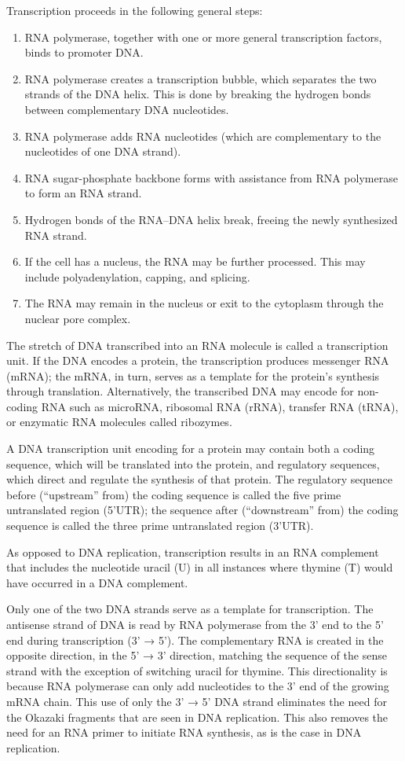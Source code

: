 Transcription proceeds in the following general steps:

\begin{enumerate}
\def\labelenumi{\arabic{enumi}.}
\tightlist
\item
  RNA polymerase, together with one or more general transcription factors, binds to promoter DNA.
\item
  RNA polymerase creates a transcription bubble, which separates the two strands of the DNA helix. This is done by breaking the hydrogen bonds between complementary DNA nucleotides.
\item
  RNA polymerase adds RNA nucleotides (which are complementary to the nucleotides of one DNA strand).
\item
  RNA sugar-phosphate backbone forms with assistance from RNA polymerase to form an RNA strand.
\item
  Hydrogen bonds of the RNA--DNA helix break, freeing the newly synthesized RNA strand.
\item
  If the cell has a nucleus, the RNA may be further processed. This may include polyadenylation, capping, and splicing.
\item
  The RNA may remain in the nucleus or exit to the cytoplasm through the nuclear pore complex.
\end{enumerate}

The stretch of DNA transcribed into an RNA molecule is called a transcription unit. If the DNA encodes a protein, the transcription produces messenger RNA (mRNA); the mRNA, in turn, serves as a template for the protein's synthesis through translation. Alternatively, the transcribed DNA may encode for non-coding RNA such as microRNA, ribosomal RNA (rRNA), transfer RNA (tRNA), or enzymatic RNA molecules called ribozymes.

A DNA transcription unit encoding for a protein may contain both a coding sequence, which will be translated into the protein, and regulatory sequences, which direct and regulate the synthesis of that protein. The regulatory sequence before (``upstream'' from) the coding sequence is called the five prime untranslated region (5'UTR); the sequence after (``downstream'' from) the coding sequence is called the three prime untranslated region (3'UTR).

As opposed to DNA replication, transcription results in an RNA complement that includes the nucleotide uracil (U) in all instances where thymine (T) would have occurred in a DNA complement.

Only one of the two DNA strands serve as a template for transcription. The antisense strand of DNA is read by RNA polymerase from the 3' end to the 5' end during transcription (3' → 5'). The complementary RNA is created in the opposite direction, in the 5' → 3' direction, matching the sequence of the sense strand with the exception of switching uracil for thymine. This directionality is because RNA polymerase can only add nucleotides to the 3' end of the growing mRNA chain. This use of only the 3' → 5' DNA strand eliminates the need for the Okazaki fragments that are seen in DNA replication. This also removes the need for an RNA primer to initiate RNA synthesis, as is the case in DNA replication.

